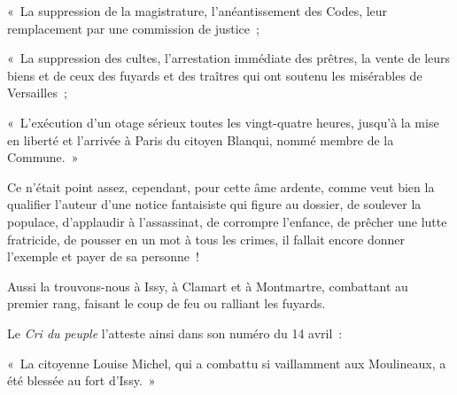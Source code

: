 \documentclass[french,twoside]{book} %
\newenvironment{quoteblock}%
  {\begin{quoting}}
  {\end{quoting}}
\newenvironment{quotebar}{%
    \def\FrameCommand{{\color{rubric!10!}\vrule width 0.5em} \hspace{0.9em}}%
    \def\OuterFrameSep{\itemsep} %
    \MakeFramed {\advance\hsize-\width \FrameRestore}
  }%
  {%
    \endMakeFramed
  }
\renewenvironment{quoteblock}%
  {%
    \savenotes
    \setstretch{0.9}
    \normalfont
    \begin{quotebar}
  }
  {%
    \end{quotebar}
    \spewnotes
  }
\begin{document}
\begin{quoteblock}
 \noindent « La suppression de la magistrature, l’anéantissement des Codes, leur remplacement par une commission de justice ;\par
 « La suppression des cultes, l’arrestation immédiate des prêtres, la vente de leurs biens et de ceux des fuyards et des traîtres qui ont soutenu les misérables de Versailles ;\par
 « L’exécution d’un otage sérieux toutes les vingt-quatre heures, jusqu’à la mise en liberté et l’arrivée à Paris du citoyen Blanqui, nommé membre de la Commune. »
 \end{quoteblock}

\noindent Ce n’était point assez, cependant, pour cette âme ardente, comme veut bien la qualifier l’auteur d’une notice fantaisiste qui figure au dossier, de soulever la populace, d’applaudir à l’assassinat, de corrompre l’enfance, de prêcher une lutte fratricide, de pousser en un mot à tous les crimes, il fallait encore donner l’exemple et payer de sa personne !\par
Aussi la trouvons-nous à Issy, à Clamart et à Montmartre, combattant au premier rang, faisant le coup de feu ou ralliant les fuyards.\par
Le \emph{Cri du peuple} l’atteste ainsi dans son numéro du 14 avril :\par

\begin{quoteblock}
 \noindent « La citoyenne Louise Michel, qui a combattu si vaillamment aux Moulineaux, a été blessée au fort d’Issy. »
 \end{quoteblock}
\end{document}
